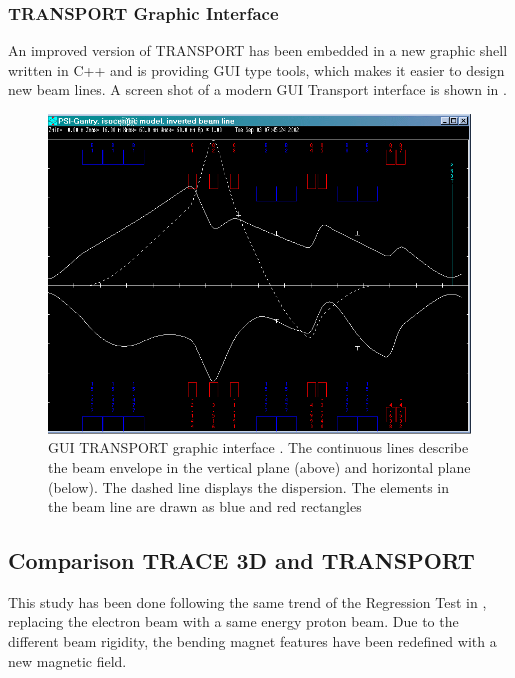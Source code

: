 \subsubsection{TRANSPORT Graphic Interface}
\label{ssec:TRAN_graphic}
An improved version of TRANSPORT has been embedded in a new graphic shell written in C++ and is providing GUI type tools, which makes it easier to design new beam lines. A screen shot of a modern GUI Transport interface \cite{Transport_GUI} is shown in .
\begin{figure}[!htb]
 \centering
     \includegraphics[width=\textwidth-1cm, keepaspectratio=true]{figures/Benchmarks/TRANSPORT.png}
    \caption{GUI TRANSPORT graphic interface \cite{Tran_ex}. The continuous lines describe the beam envelope in the vertical plane (above) and horizontal plane (below). The dashed line displays the dispersion. The elements in the beam line are drawn as blue and red rectangles}
 \label{fig:TRANSPORT}
\end{figure}

\subsection{Comparison TRACE 3D and TRANSPORT}
\label{sec:T3D_TRAN}
This study has been done following the same trend of the Regression Test in \opal \cite{AMAS}, replacing the electron beam with a same energy proton beam. Due to the different beam rigidity, the bending magnet features have been redefined with a new magnetic field.

